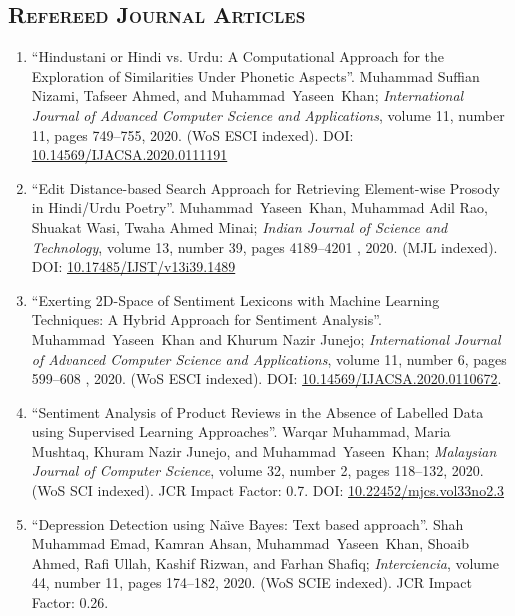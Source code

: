 \documentclass[a4paper, 10pt]{article}
\begin{document}
\subsection*{\normalfont\textsc{ Refereed Journal Articles}}
\begin{enumerate}
\itemsep-4pt 
	
	\item ``Hindustani or Hindi vs. Urdu: A Computational Approach for the Exploration of Similarities Under Phonetic Aspects''. Muhammad Suffian Nizami, Tafseer Ahmed, and \textcolor{NavyBlue}{Muhammad~Yaseen~Khan}; \emph{International Journal of Advanced Computer Science and Applications}, volume 11, number 11, pages  749--755, 2020. (WoS ESCI indexed). DOI: \href{https://dx.doi.org/10.14569/IJACSA.2020.0111191}{10.14569/IJACSA.2020.0111191}
	
	\item ``Edit Distance-based Search Approach for Retrieving  Element-wise Prosody in Hindi/Urdu Poetry''. \textcolor{NavyBlue}{Muhammad~Yaseen~Khan}, Muhammad Adil Rao, Shuakat Wasi, Twaha Ahmed Minai; \emph{Indian Journal of Science and Technology}, volume 13, number 39, pages  4189--4201
, 2020. (MJL indexed). DOI: \href{https://doi.org/10.17485/IJST/v13i39.1489}{10.17485/IJST/v13i39.1489}

	\item ``Exerting 2D-Space of Sentiment Lexicons with Machine Learning Techniques: A Hybrid Approach for Sentiment Analysis''. \textcolor{NavyBlue}{Muhammad~Yaseen~Khan} and Khurum Nazir Junejo; \emph{International Journal of Advanced Computer Science and Applications}, volume 11, number 6, pages 599--608
, 2020. (WoS ESCI indexed). DOI: \href{https://doi.org/10.14569/IJACSA.2020.0110672}{10.14569/IJACSA.2020.0110672}.
       
    \item ``Sentiment Analysis of Product Reviews in the Absence of Labelled Data using Supervised Learning Approaches''. Warqar Muhammad, Maria Mushtaq, Khuram Nazir Junejo, and \textcolor{NavyBlue}{Muhammad~Yaseen~Khan}; \emph{Malaysian Journal of Computer Science}, volume 32, number 2, pages 118--132, 2020. (WoS SCI indexed). JCR Impact Factor: 0.7. DOI: \href{https://doi.org/10.22452/mjcs.vol33no2.3}{10.22452/mjcs.vol33no2.3}
    
    \item ``Depression Detection using Na\"{\i}ve Bayes: Text based approach''. Shah Muhammad Emad, Kamran Ahsan, \textcolor{NavyBlue}{Muhammad~Yaseen~Khan}, Shoaib Ahmed, Rafi Ullah, Kashif Rizwan, and Farhan Shafiq; \emph{Interciencia}, volume 44, number 11, pages 174--182, 2020. (WoS SCIE indexed). JCR Impact Factor: 0.26.
	

\end{enumerate}
\end{document}
